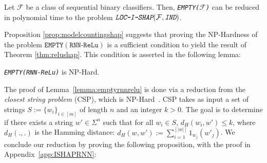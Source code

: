 \begin{proposition} \label{prop:modelcountingshap}
Let $\mathcal{F}$ be a class of sequential binary classifiers. Then, \emph{\texttt{EMPTY($\mathcal{F}$)}} can be reduced in polynomial time to the problem $\emph{\texttt{LOC-I-SHAP}}(\mathcal{F}, \emph{\texttt{IND}})$.
\end{proposition}


Proposition \ref{prop:modelcountingshap} suggests that proving the NP-Hardness of the problem $\texttt{EMPTY}(\texttt{RNN-ReLu})$ is a sufficient condition to yield the result of Theorem \ref{thm:relushap}. This condition is asserted in the following lemma:
\begin{lemma} \label{lemma:emptyrnnrelu}
\emph{\texttt{EMPTY}}\emph{\texttt{(RNN-ReLu)}} is NP-Hard. 
\end{lemma}



The proof of Lemma~\ref{lemma:emptyrnnrelu} is done via a reduction from the \emph{closest string problem} (CSP), which is NP-Hard~\citep{li2000closest}. CSP takes as input a set of strings $S := \{w_{i}\}_{i \in [m]}$ of length $n$ and an integer $k > 0$. The goal is to determine if there exists a string $w' \in \Sigma^{n}$ such that for all $w_{i} \in S$, $d_{H}(w_{i}, w') \leq k$, where $d_{H}(.,.)$ is the Hamming distance: $d_{H}(w,w') := \sum\limits_{i=1}^{ [|w|]} \mathrm{1}_{w_{j}}(w'_{j})$. We conclude our reduction by proving the following proposition, with the proof in Appendix~\ref{app:ISHAPRNN}:



